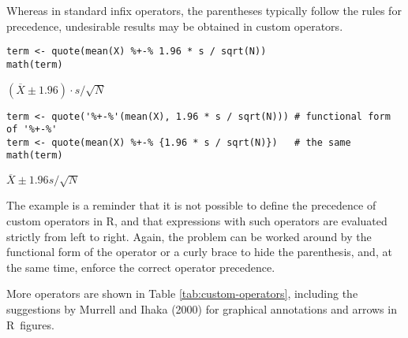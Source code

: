 Whereas in standard infix operators, the parentheses typically follow the rules
for precedence, undesirable results may be obtained in custom operators.

\begin{verbatim}
term <- quote(mean(X) %+-% 1.96 * s / sqrt(N))
math(term)
\end{verbatim}

\({{\left({\overline{X}}{\pm}{1.96}\right)}{\cdot}{s}}{/}{\sqrt{N}}\)

\begin{verbatim}
term <- quote('%+-%'(mean(X), 1.96 * s / sqrt(N))) # functional form of '%+-%'
term <- quote(mean(X) %+-% {1.96 * s / sqrt(N)})   # the same
math(term)
\end{verbatim}

\({\overline{X}}{\pm}{{{1.96}{{}}{s}}{/}{\sqrt{N}}}\)

The example is a reminder that it is not possible to define the precedence of
custom operators in R, and that expressions with such operators are evaluated
strictly from left to right. Again, the problem can be worked around by the
functional form of the operator or a curly brace to hide the parenthesis, and,
at the same time, enforce the correct operator precedence.

More operators are shown in Table \ref{tab:custom-operators}, including the
suggestions by Murrell and Ihaka (2000) for graphical annotations and
arrows in R~figures.


